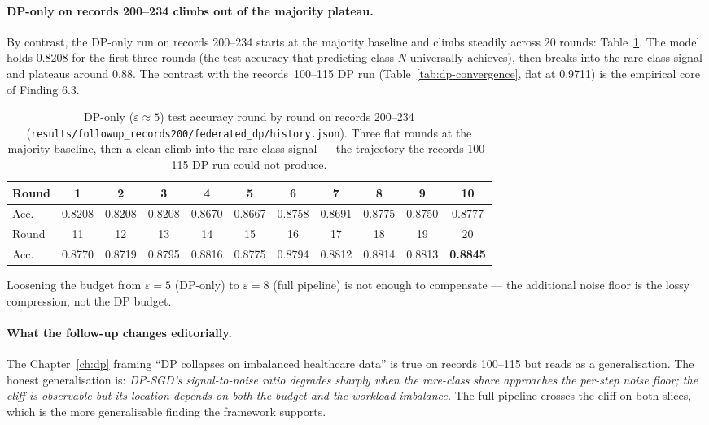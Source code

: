 \documentclass[11pt,a4paper]{report}
\begin{document}
\paragraph{DP-only on records 200--234 climbs out of the majority
plateau.}
By contrast, the DP-only run on records 200--234 starts at the majority
baseline and climbs steadily across 20 rounds:
Table~\ref{tab:dp-200-convergence}. The model holds 0.8208 for the
first three rounds (the test accuracy that predicting class \emph{N}
universally achieves), then breaks into the rare-class signal and
plateaus around 0.88. The contrast with the
records~100--115 DP run (Table~\ref{tab:dp-convergence}, flat at
0.9711) is the empirical core of Finding 6.3.

\begin{table}[h]
  \centering
  \caption{DP-only ($\varepsilon\!\approx\!5$) test accuracy round by
  round on records 200--234
  (\texttt{results/followup\_records200/federated\_dp/history.json}).
  Three flat rounds at the majority baseline, then a clean climb into
  the rare-class signal --- the trajectory the records 100--115 DP run
  could not produce.}
  \label{tab:dp-200-convergence}
  \begin{tabular}{lcccccccccc}
    \toprule
    Round & 1 & 2 & 3 & 4 & 5 & 6 & 7 & 8 & 9 & 10 \\
    \midrule
    Acc.\ & 0.8208 & 0.8208 & 0.8208 & 0.8670 & 0.8667 & 0.8758 & 0.8691 & 0.8775 & 0.8750 & 0.8777 \\
    \midrule
    Round & 11 & 12 & 13 & 14 & 15 & 16 & 17 & 18 & 19 & 20 \\
    \midrule
    Acc.\ & 0.8770 & 0.8719 & 0.8795 & 0.8816 & 0.8775 & 0.8794 & 0.8812 & 0.8814 & 0.8813 & \textbf{0.8845} \\
    \bottomrule
  \end{tabular}
\end{table}
Loosening the budget from $\varepsilon = 5$ (DP-only) to
$\varepsilon = 8$ (full pipeline) is not enough to compensate ---
the additional noise floor is the lossy compression, not the
DP budget.

\paragraph{What the follow-up changes editorially.}
The Chapter~\ref{ch:dp} framing ``DP collapses on imbalanced
healthcare data'' is true on records 100--115 but reads as a
generalisation. The honest generalisation is: \emph{DP-SGD's
signal-to-noise ratio degrades sharply when the rare-class share
approaches the per-step noise floor; the cliff is observable but its
location depends on both the budget and the workload imbalance.} The
full pipeline crosses the cliff on both slices, which is the more
generalisable finding the framework supports.
\end{document}
